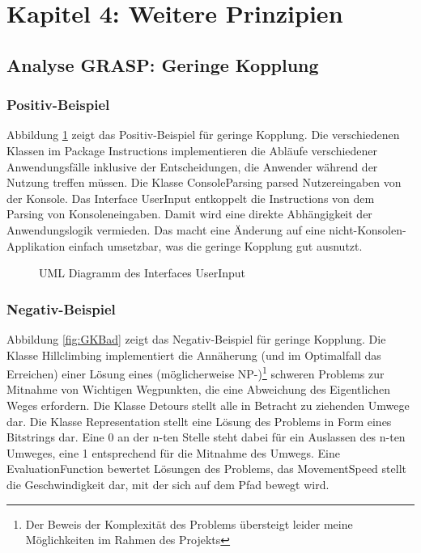 \section{Kapitel 4: Weitere Prinzipien}

\subsection{Analyse GRASP: Geringe Kopplung}


\subsubsection{Positiv-Beispiel}

Abbildung \ref{fig:GKGut} zeigt das Positiv-Beispiel für geringe Kopplung.
Die verschiedenen Klassen im Package Instructions implementieren die Abläufe verschiedener Anwendungsfälle inklusive der Entscheidungen, die Anwender während der Nutzung treffen müssen.
Die Klasse ConsoleParsing parsed Nutzereingaben von der Konsole.
 Das Interface UserInput entkoppelt die Instructions von dem Parsing von Konsoleneingaben. Damit wird eine direkte Abhängigkeit der Anwendungslogik vermieden. Das macht eine Änderung auf eine nicht-Konsolen-Applikation einfach umsetzbar, was die geringe Kopplung gut ausnutzt. 

\begin{figure}[H]
  \label{fig:GKGut}
  \centering
  
  \caption{UML Diagramm des Interfaces UserInput}
\end{figure}

\subsubsection{Negativ-Beispiel}

Abbildung \ref{fig:GKBad} zeigt das Negativ-Beispiel für geringe Kopplung.
Die Klasse Hillclimbing implementiert die Annäherung (und im Optimalfall das Erreichen) einer Lösung eines (möglicherweise NP-)\footnote{Der Beweis der Komplexität des Problems übersteigt leider meine Möglichkeiten im Rahmen des Projekts} schweren Problems zur Mitnahme von Wichtigen Wegpunkten, die eine Abweichung des Eigentlichen Weges erfordern.
Die Klasse Detours stellt alle in Betracht zu ziehenden Umwege dar. 
Die Klasse Representation stellt eine Lösung des Problems in Form eines Bitstrings dar. Eine 0 an der n-ten Stelle steht dabei für ein Auslassen des n-ten Umweges, eine 1 entsprechend für die Mitnahme des Umwegs.
Eine EvaluationFunction bewertet Lösungen des Problems, das MovementSpeed stellt die Geschwindigkeit dar, mit der sich auf dem Pfad bewegt wird.

